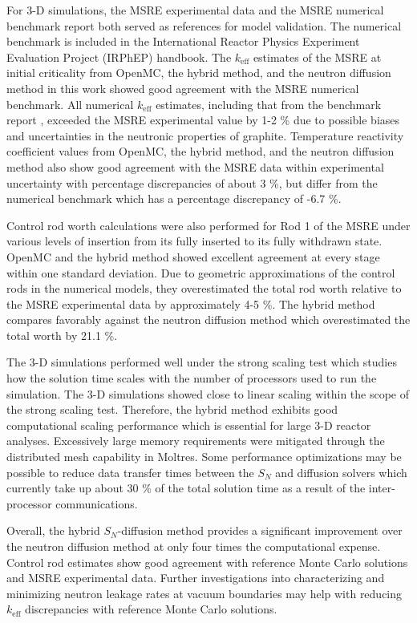 For 3-D simulations, the \gls{MSRE} experimental data and the \gls{MSRE} numerical benchmark
report \cite{fratoni_molten_2020} both served as references for model validation. The numerical
benchmark is included in the International Reactor Physics Experiment Evaluation Project (IRPhEP)
handbook. The
$k_\text{eff}$ estimates of the \gls{MSRE} at initial criticality from OpenMC, the hybrid method,
and the neutron diffusion method in this work showed good agreement with the \gls{MSRE} numerical
benchmark. All numerical $k_\text{eff}$ estimates, including that from the benchmark report
\cite{fratoni_molten_2020}, exceeded the \gls{MSRE} experimental value by 1-2 \% due to possible
biases and uncertainties in the neutronic properties of graphite. Temperature reactivity
coefficient values from OpenMC, the hybrid method, and the neutron diffusion method also show good
agreement with the \gls{MSRE} data within experimental uncertainty with percentage discrepancies of
about 3 \%, but differ from the numerical benchmark which has a percentage discrepancy of -6.7 \%.

Control rod worth calculations were also performed for Rod 1 of the \gls{MSRE} under various levels
of insertion from its fully inserted to its fully withdrawn state. OpenMC and the hybrid method
showed excellent agreement at every stage within one standard deviation. Due to geometric
approximations of the control rods in the numerical models, they overestimated the total
rod worth relative to the \gls{MSRE} experimental data by approximately 4-5 \%. The hybrid method
compares favorably against the neutron diffusion method which overestimated the total worth by
21.1 \%.

The 3-D simulations performed well under the strong scaling test which studies how the solution
time scales with the number of processors used to run the simulation. The 3-D simulations showed
close to linear scaling within the scope of the strong scaling test. Therefore, the hybrid method
exhibits good computational scaling performance which is essential for large 3-D reactor analyses.
Excessively large memory requirements were mitigated through the distributed mesh capability in
Moltres. Some performance optimizations may be possible to reduce data transfer times
between the $S_N$ and diffusion solvers which currently take up about 30 \% of the total solution
time as a result of the inter-processor communications.

Overall, the hybrid $S_N$-diffusion method provides a significant improvement over the neutron
diffusion method at only four times the computational expense. Control rod estimates
show good agreement with reference Monte Carlo solutions and \gls{MSRE} experimental data.
Further investigations into characterizing and minimizing neutron leakage rates at vacuum
boundaries may help with reducing $k_\text{eff}$ discrepancies with reference Monte Carlo
solutions.
